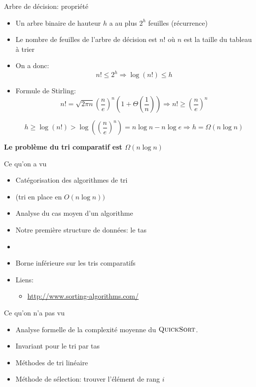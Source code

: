 \begin{frame}{Arbre de décision: propriété}
\begin{itemize}
\item Un arbre binaire de hauteur $h$ a au plus $2^h$ feuilles (récurrence)
\item Le nombre de feuilles de l'arbre de décision est  $n!$ où  $n$ est la taille du tableau à trier
% 
\item On a donc:
$$n!\leq 2^h \Rightarrow \log(n!)\leq h$$
\item Formule de Stirling:
$$n!=\sqrt{2\pi n} (\frac{n}{e})^n (1+\Theta(\frac{1}{n}))\Rightarrow n!\geq (\frac{n}{e})^n$$

$$h\geq \log(n!)>\log((\frac{n}{e})^n)=n\log n - n\log e\Rightarrow h=\Omega(n\log n)$$

\end{itemize}
\bigskip

\centerline{\bf Le problème du tri comparatif est $\Omega(n\log n)$}


\end{frame}

\begin{frame}{Ce qu'on a vu}

\begin{itemize}
\item Catégorisation des algorithmes de tri
\item {} (tri en place en $O(n\log n))$
\item Analyse du cas moyen d'un algorithme
\item Notre première structure de données: le tas
\item {}
\item Borne inférieure sur les tris comparatifs

\bigskip

\item Liens:
\begin{itemize}
\item \url{http://www.sorting-algorithms.com/}
\end{itemize}

\end{itemize}

\end{frame}

\begin{frame}{Ce qu'on n'a pas vu}

\begin{itemize}
\item Analyse formelle de la complexité moyenne du $\textnormal{\scshape QuickSort}$.
\item Invariant pour le tri par tas
\item Méthodes de tri linéaire
\item Méthode de sélection: trouver l'élément de rang $i$
\end{itemize}

\end{frame}
